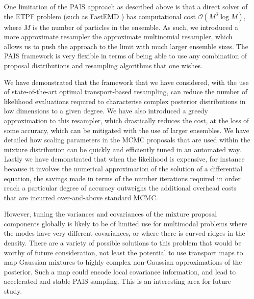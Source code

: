 \documentclass[final]{siamltex}
\begin{document}
One limitation of the PAIS approach as described above is that a
direct solver of the ETPF problem (such as FastEMD \cite{FastEMD}) has computational cost
$\mathcal{O}(M^3\log M)$, where $M$ is the number of particles in the
ensemble. As such, we introduced a more approximate resampler the
approximate multinomial resampler, which allows us to push the
approach to the limit
with much larger ensemble sizes. The PAIS framework is very flexible
in terms of being able to use any combination of proposal
distributions and resampling algorithms that one wishes.

We have demonstrated that the framework that we have considered, with
the use of state-of-the-art optimal transport-based resampling, can
reduce the number of likelihood evaluations required to characterise
complex posterior distributions in low dimensions to a given
degree. We have also introduced a greedy approximation to this
resampler, which drastically reduces the cost, at the loss of some
accuracy, which can be mitigated with the use of larger
ensembles. We have detailed how scaling parameters in the MCMC
proposals that are used within the mixture distribution can be quickly
and efficiently
tuned in an automated way. Lastly we have demonstrated that when the
likelihood is expensive, for instance because it involves the
numerical approximation of the solution of a differential equation, the savings made in terms of the number
iterations required in order reach a particular degree of accuracy
outweighs the additional overhead costs that are incurred
over-and-above standard MCMC.

However, tuning the variances and
covariances of the mixture proposal components
globally is likely to be of limited use for multimodal problems where
the modes have very different covariances, or where there is curved
ridges in the density. There are a variety of possible solutions to
this problem that would be worthy of future consideration, not least
the potential to use transport maps\cite{el2012bayesian,parno2014transport} to map Gaussian mixtures to
highly complex non-Gaussian approximations of the posterior. Such a
map could encode local covariance information, and lead to accelerated
and stable PAIS sampling. This is an interesting area for future study.
\end{document}
